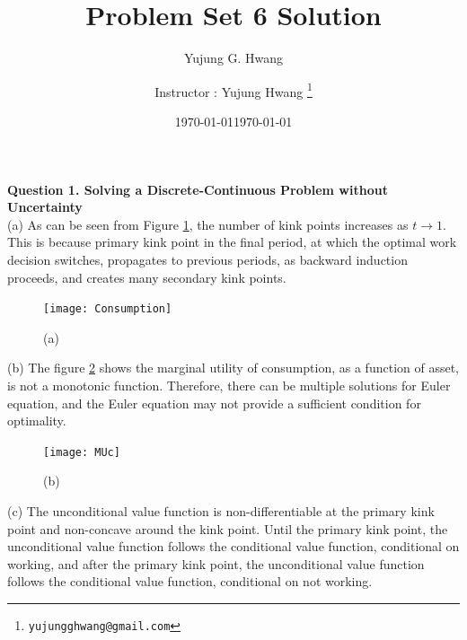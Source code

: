 \documentclass[paper=a4, fontsize=13pt]{extarticle} %
\author{Yujung G. Hwang} %
\date{\today} %
\begin{document}
	
	\title{	
		\normalfont \normalsize 
		\huge Problem Set 6 Solution
	}
	\author{
		Instructor : Yujung Hwang \thanks{\texttt{yujungghwang@gmail.com}}} %
	\date{\today} %
	\maketitle %
	
	\upshape \mdseries 

	\normalsize
	\textbf{Question 1. Solving a Discrete-Continuous Problem without Uncertainty} \\

	(a) As can be seen from Figure \ref{fig:consumption}, the number of kink points increases as $t \rightarrow 1$. This is because primary kink point in the final period, at which the optimal work decision switches, propagates to previous periods, as backward induction proceeds, and creates many secondary kink points. \\ 
	
	\begin{figure}[H]
		\centering
	    \caption{(a)}\label{fig:consumption}
		\texttt{[image: Consumption]}
	\end{figure}
	
	
	
	
	(b)   The figure \ref{fig:MUc} shows the marginal utility of consumption, as a function of asset, is not a monotonic function. Therefore, there can be multiple solutions for Euler equation, and the Euler equation may not provide a sufficient condition for optimality.\\
		
	\begin{figure}[H]
		\centering
		\caption{(b)}\label{fig:MUc}
		\texttt{[image: MUc]}
	\end{figure}



	
	(c) The unconditional value function is non-differentiable at the primary kink point and non-concave around the kink point. Until the primary kink point, the unconditional value function follows the conditional value function, conditional on working, and after the primary kink point, the unconditional value function follows the conditional value function, conditional on not working.\\
	
\end{document}
